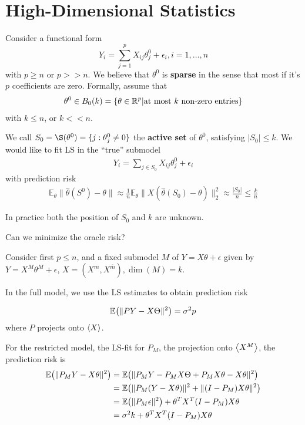 
\chapter{High-Dimensional Statistics}
\label{cha:high-dimens-stat}


Consider a functional form
\begin{equation}
  \label{eq:101}
  Y_{i} = \sum_{j=1}^{p} X_{ij} \theta^{0}_{j} + \epsilon_{i}, i = 1,
  \dots, n
\end{equation}
with $p \geq n$ or $p >> n$.  We believe that $\theta^{0}$ is
\textbf{sparse} in the sense that most if it's $p$ coefficients are
zero.  Formally, assume that
\begin{align}
  \label{eq:102}
  \theta^{0} \in B_{0}(k) = \{ \theta \in \mathbb{R}^{p} | \text{at most $k$
    non-zero entries} \}
\end{align} with $k \leq n$, or $k << n$.

We call $S_{0} = \S(\theta^{0}) = \{ j: \theta_{j}^{0} \neq 0 \}$  the
\textbf{active set} of $\theta^{0}$, satisfying $|S_{0}| \leq k$. We
would like to fit LS in the ``true'' submodel
\begin{align}
  \label{eq:103}
  Y_{i} = \sum_{j \in S_{0}} X_{ij} \theta_{j}^{0} + \epsilon_{i}
\end{align} with prediction risk
\begin{align}
  \label{eq:104}
  \mathbb{E}_{\theta} \| \hat \theta(S^{0})- \theta \| \approx
  \frac{1}{n} \mathbb{E}_{\theta} \| X(\hat \theta(S_{0}) - \theta)
  \|_{2}^{2} \approx \frac{|S_{0}|}{n} \leq \frac{k}{n}
\end{align}

In practice both the position of $S_{0}$ and $k$ are unknown.

\begin{question}
  Can we minimize the oracle risk?
\end{question}

Consider first $p \leq n$, and a fixed submodel $M$ of $Y = X \theta +
\epsilon$ given by $Y = X^{M} \theta^{M} + \epsilon$, $X = (X^{m},
X^{\bar m}), \dim(M) = k$.

In the full model, we use the LS estimates to obtain prediction risk

\begin{align}
  \label{eq:106}
  \E{\|PY - X\Theta \|^{2}} = \sigma^{2}p
\end{align} where $P$ projects onto $\IP{X}$.

For the restricted model, the LS-fit for $P_{M}$, the projection onto
$\IP{X^{M}}$, the prediction risk is
\begin{align}
  \label{eq:107}
  \E{\| P_{M} Y - X \theta \|^{2}} &= \E{\| P_{M} Y - P_{M} X \Theta +
    P_{M} X \theta - X \theta \|^{2}} \\
  &= \E{\|P_{M}(Y - X \theta) \|^{2} + \| (I - P_{M}) X \theta \|^{2}} \\
  &= \E{\| P_{M}\epsilon \|^{2}} + \theta^{T} X^{T} (I - P_{M}) X
  \theta \\
  &= \sigma^{2} k + \theta^{T} X^{T} (I - P_{M}) X \theta
\end{align}

